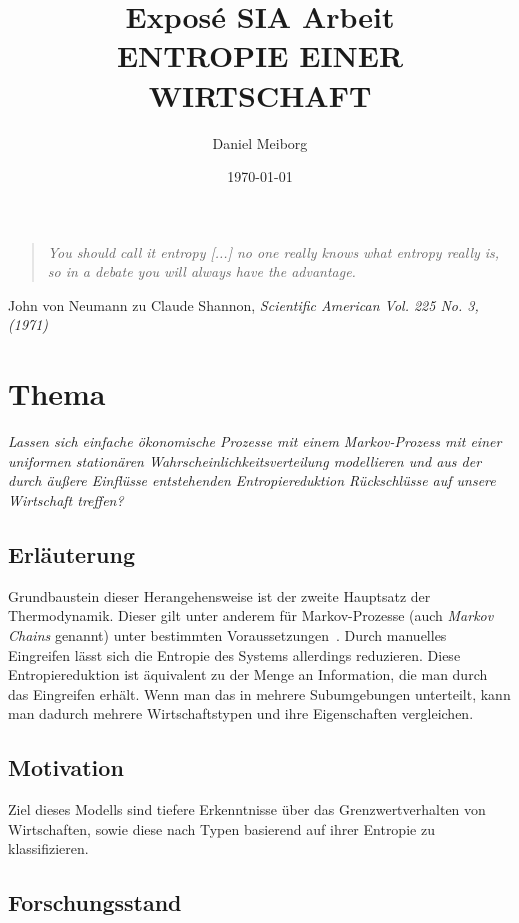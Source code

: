 \documentclass[12pt]{article}
\title{Exposé SIA Arbeit \\[1ex] \large ENTROPIE EINER WIRTSCHAFT}
\author{Daniel Meiborg}
\date{\today}
\begin{document}
    \maketitle
    \begin{quotation}
        \begin{flushright}
            \textit{You should call it entropy [...] no one really knows what
            entropy really is, so in a debate you will always have the advantage.}
        \end{flushright}
    \end{quotation}
    John von Neumann zu Claude Shannon,\textit{ Scientific American Vol. 225 No. 3,
        (1971)}

    \section*{Thema}

    \textit{Lassen sich einfache ökonomische Prozesse mit einem Markov-Prozess mit einer
    uniformen stationären Wahrscheinlichkeitsverteilung modellieren und aus der durch
    äußere Einflüsse entstehenden Entropiereduktion Rückschlüsse auf unsere Wirtschaft
    treffen?}


    \subsection*{Erläuterung}
    Grundbaustein dieser Herangehensweise ist der zweite Hauptsatz der Thermodynamik.
    Dieser gilt unter anderem für Markov-Prozesse (auch \textit{Markov Chains} genannt)
    unter bestimmten Voraussetzungen~\cite{cover1994processes}.
    Durch manuelles Eingreifen lässt sich die Entropie des Systems allerdings reduzieren.
    Diese Entropiereduktion ist äquivalent zu der Menge an Information, die man durch das
    Eingreifen erhält.
    Wenn man das in mehrere Subumgebungen unterteilt, kann man dadurch mehrere
    Wirtschaftstypen und ihre Eigenschaften vergleichen.

    \subsection*{Motivation}

    Ziel dieses Modells sind tiefere Erkenntnisse über das Grenzwertverhalten von
    Wirtschaften, sowie diese nach Typen basierend auf ihrer Entropie zu klassifizieren.

    \subsection*{Forschungsstand}
\end{document}
